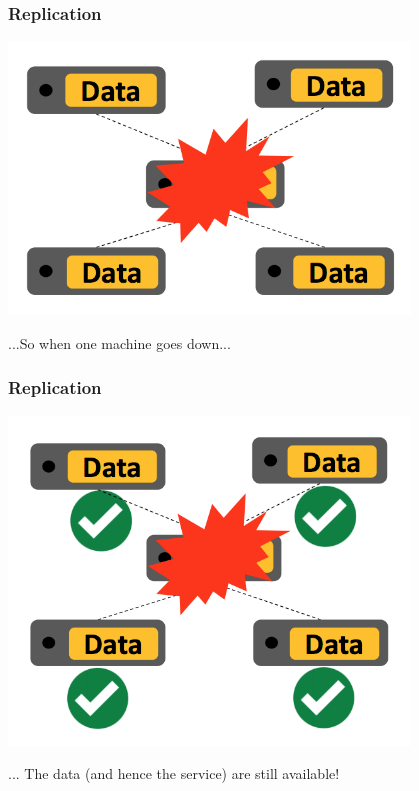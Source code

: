 \documentclass[numfooter,sectionpages,protectFrameTitle, progressbar, cblock, valigncolumns, addlogo]{beamer}
\begin{document}
\begin{frame}
    \frametitle{Replication}

    \centering
        \includegraphics[width=0.8\textwidth]{rep2}

        ...So when one machine goes down...
\end{frame}

\begin{frame}
    \frametitle{Replication}

    \centering
        \includegraphics[width=0.8\textwidth]{rep3}

        ... The data (and hence the service) are still available!
\end{frame}
\end{document}
